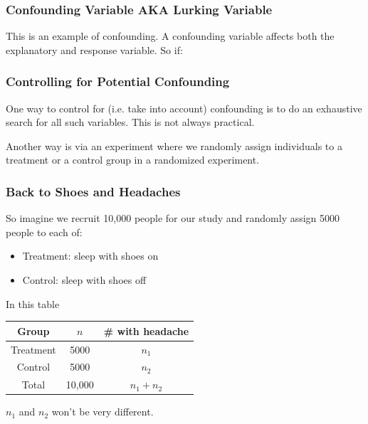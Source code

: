 \documentclass[handout]{beamer}
\newcommand{\blue}[1]{\textcolor{blue2}{#1}}
\begin{document}
\begin{frame}
\frametitle{Confounding Variable AKA Lurking Variable}

This is an example of \blue{confounding}.  A confounding variable affects both the explanatory and response variable.  So if:
\vspace{6cm}

\end{frame}


\begin{frame}
\frametitle{Controlling for Potential Confounding}

One way to \blue{control for} (i.e. take into account) confounding is to do an exhaustive search for all such variables.  This is not always practical.

\vspace{0.25in}

\pause Another way is via an experiment where we randomly assign individuals to a \blue{treatment} or a \blue{control} group in a \blue{randomized experiment}.


\end{frame}


\begin{frame}
\frametitle{Back to Shoes and Headaches}

So imagine we recruit 10,000 people for our study and \blue{randomly assign} 5000 people to each of:

\begin{itemize}
\item Treatment: sleep with shoes \blue{on}
\item Control: sleep with shoes \blue{off}
\end{itemize}

\pause In this table
\begin{center}
	\begin{tabular}{c|cc}
		Group & $n$ & \# with headache\\
		\hline	
		Treatment & 5000 & $n_1$\\
		Control & 5000 & $n_2$\\
		\hline
		Total & 10,000 & $n_1 + n_2$\\
  \end{tabular}
\end{center}
\pause $n_1$ and $n_2$ won't be very different.  

\end{frame}
\end{document}
